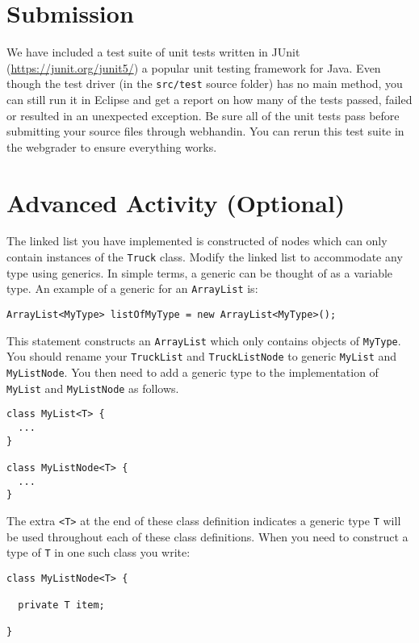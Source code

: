\documentclass[12pt]{scrartcl}
\begin{document}
\section*{Submission}

We have included a test suite of unit tests written in JUnit 
(\url{https://junit.org/junit5/}) a popular unit testing framework for
Java.  Even though the test driver (in the \texttt{src/test}
source folder) has no main method, you can still run it in Eclipse and
get a report on how many of the tests passed, failed or resulted in 
an unexpected exception.  Be sure all of the unit tests pass before
submitting your source files through webhandin.  You can rerun this
test suite in the webgrader to ensure everything works.  

\section*{Advanced Activity (Optional)}

The linked list you have implemented is constructed of nodes which 
can only contain instances of the \texttt{Truck} class. 
Modify the linked list to accommodate any type using generics. In 
simple terms, a generic can be thought of as a variable type. An 
example of a generic for an \texttt{ArrayList} is:

\texttt{ArrayList<MyType> listOfMyType = new ArrayList<MyType>();}

This statement constructs an \texttt{ArrayList} which 
only contains objects of \texttt{MyType}. You should 
rename your \texttt{TruckList} and \texttt{TruckListNode} 
to generic \texttt{MyList} and \texttt{MyListNode}.  
You then need to add a generic type to the implementation of 
\texttt{MyList} and \texttt{MyListNode} as follows.

\begin{verbatim}
class MyList<T> { 
  ... 
}

class MyListNode<T> { 
  ... 
}
\end{verbatim}

The extra \texttt{<T>} at the end of these class definition 
indicates a generic type \texttt{T} will be used throughout 
each of these class definitions. When you need to construct a type of 
\texttt{T} in one such class you write:

\begin{verbatim}
class MyListNode<T> {

  private T item;

}
\end{verbatim}
\end{document}

